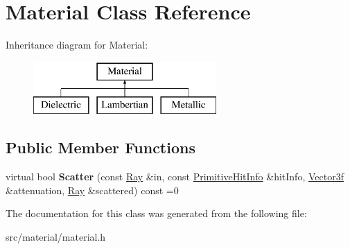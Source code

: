 \hypertarget{class_material}{}\section{Material Class Reference}
\label{class_material}
Inheritance diagram for Material\+:\begin{figure}[H]
\begin{center}
\leavevmode
\includegraphics[height=2.000000cm]{class_material}
\end{center}
\end{figure}
\subsection*{Public Member Functions}
\begin{DoxyCompactItemize}
\item 
\mbox{\label{class_material_af2ee15ea0a7c748136e3a9e57394bc8d}} 
virtual bool {\bfseries Scatter} (const \mbox{\hyperlink{class_ray}{Ray}} \&in, const \mbox{\hyperlink{struct_primitive_hit_info}{Primitive\+Hit\+Info}} \&hit\+Info, \mbox{\hyperlink{class_vector3}{Vector3f}} \&attenuation, \mbox{\hyperlink{class_ray}{Ray}} \&scattered) const =0
\end{DoxyCompactItemize}


The documentation for this class was generated from the following file\+:\begin{DoxyCompactItemize}
\item 
src/material/material.\+h\end{DoxyCompactItemize}

